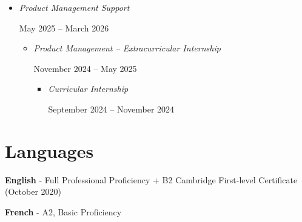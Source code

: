 \documentclass[10pt,a4paper]{article}
\begin{document}
\begin{itemize}[
    leftmargin=5mm,
    itemsep=0pt,
    label={-}
]

\item
\textit{Product Management Support}

\par
May 2025 -- March 2026

\vspace{1pt}



\begin{itemize}[
    leftmargin=8mm,
    itemsep=2pt,
    label={-}
]

\item
\textit{
Product Management -- Extracurricular Internship
}

\par
November 2024 -- May 2025


\begin{itemize}[
    leftmargin=8mm,
    itemsep=2pt,
    label={-}
]

\item
\textit{
Curricular Internship
}

\par
September 2024 -- November 2024

\end{itemize}

\end{itemize}

\end{itemize}


\section*{Languages}

\vspace{6pt}

\textbf{English}
{\small
- Full Professional Proficiency + B2 Cambridge First-level Certificate (October 2020)
}

\par

\textbf{French}
{\small
- A2, Basic Proficiency
}
\end{document}
